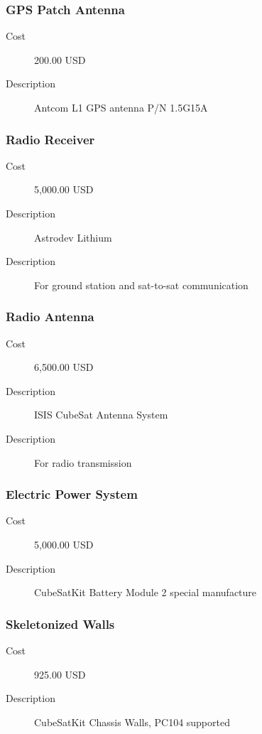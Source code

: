 \subsubsection{GPS Patch Antenna}
\begin{description}
\item[Cost] 200.00 USD
\item[Description] Antcom L1 GPS antenna P/N 1.5G15A
\end{description}

\subsubsection{Radio Receiver}
\begin{description}
\item[Cost] 5,000.00 USD
\item[Description] Astrodev Lithium
\item[Description] For ground station and sat-to-sat communication
\end{description}

\subsubsection{Radio Antenna}
\begin{description}
\item[Cost] 6,500.00 USD
\item[Description] ISIS CubeSat Antenna System
\item[Description] For radio transmission
\end{description}

\subsubsection{Electric Power System}
\begin{description}
\item[Cost] 5,000.00 USD
\item[Description] CubeSatKit Battery Module 2 special manufacture
\end{description}

\subsubsection{Skeletonized Walls}
\begin{description}
\item[Cost] 925.00 USD
\item[Description] CubeSatKit Chassis Walls, PC104 supported
\end{description}

